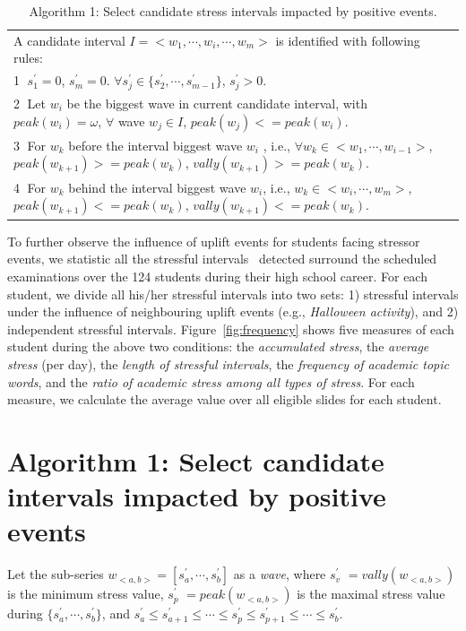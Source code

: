 \begin{table}
\begin{center}
\caption{\small{Algorithm 1: Select candidate stress intervals impacted by positive events.}}
\begin{tabular}{l} \hline
A candidate interval $I = <w_1,\cdots, w_i,\cdots, w_m>$ is identified with following rules:\\
\textcircled{1} $s^{'}_1 = 0$, $s^{'}_m = 0$. $\forall s^{'}_j \in \{s^{'}_2,\cdots,s^{'}_{m-1}\}$, $s^{'}_j > 0$.\\
\textcircled{2} Let $w_i$ be the biggest wave in current candidate interval, with $peak(w_i) = \omega$, $\forall $ wave $w_j \in I$, $peak(w_j)<=peak(w_i)$.\\
\textcircled{3} For $w_k$ before the interval biggest wave $w_i$ , i.e., $\forall w_k \in <w_1,\cdots,w_{i-1}>$, $peak(w_{k+1})>=peak(w_k)$, $vally(w_{k+1}) >= peak(w_k)$.\\
\textcircled{4} For $w_k$ behind the interval biggest wave $w_i$, i.e.,  $w_k \in <w_{i}, \cdots, w_m>$, $peak(w_{k+1})<=peak(w_k)$, $vally(w_{k+1}) <= peak(w_k)$.\\\hline
\end{tabular}
\end{center}
\end{table}

To further observe the influence of uplift events for students facing stressor events,
we statistic all the stressful intervals~\cite{Li2017Analyzing} detected surround the scheduled examinations over the 124 students during their high school career.
For each student, we divide all his/her stressful intervals into two sets:
1) stressful intervals under the influence of neighbouring uplift events (e.g., \emph{Halloween activity}), and 2) independent stressful intervals.
Figure~\ref{fig:frequency} shows five measures of each student during the above two conditions:
the \emph{accumulated stress}, the \emph{average stress} (per day), the \emph{length of stressful intervals},
the \emph{frequency of academic topic words}, and the \emph{ratio of academic stress among all types of stress}.
For each measure, we calculate the average value over all eligible slides for each student.

\section{Algorithm 1: Select candidate intervals impacted by positive events}
\label{alg:alg1}
Let the sub-series $w_{<a,b>} = [s^{'}_a, \cdots, s^{'}_b]$ as a \emph{wave},
where $s^{'}_v$ $= {vally(w_{<a,b>})}$ is the minimum stress value,
$s^{'}_p$ $= peak(w_{<a,b>})$ is the maximal stress value during $\{s^{'}_a,\cdots,s^{'}_b\}$,
and $s^{'}_a \leq s^{'}_{a+1} \leq \cdots \leq s^{'}_p \leq s^{'}_{p+1} \leq \cdots \leq s^{'}_b$.

